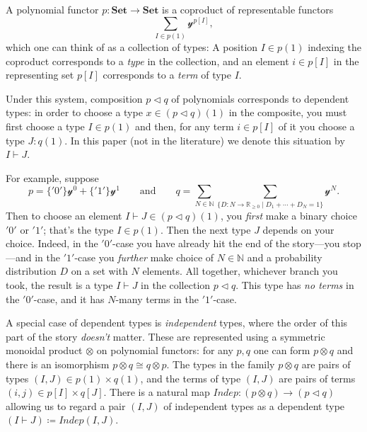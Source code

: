 \documentclass[11pt, one side, article]{memoir}
\theoremstyle{definition}
\theoremstyle{plain}
\newcommand{\Cat}[1]{\mathbf{#1}}%
\newcommand{\Fun}[1]{\mathit{#1}}%
\newcommand{\nn}{\mathbb{N}}
\newcommand{\rr}{\mathbb{R}}
\newcommand{\smset}{\Cat{Set}}
\newcommand{\yon}{\mathcal{y}}
\newcommand{\0}{\textsf{0}}
\newcommand{\1}{\tn{\textsf{1}}}
\newcommand{\tri}{\mathbin{\triangleleft}}
\newcommand{\indep}{\Fun{Indep}}
\newcommand{\qqand}{\qquad\text{and}\qquad}
\begin{document}
A polynomial functor $p\colon\smset\to\smset$ is a coproduct of representable functors
\[\sum_{I\in p(1)}\yon^{p[I]},\]
which one can think of as a collection of types: A position $I\in p(1)$ indexing the coproduct corresponds to a \emph{type} in the collection, and an element $i\in p[I]$ in the representing set $p[I]$ corresponds to a \emph{term} of type $I$. 

Under this system, composition $p\tri q$ of polynomials corresponds to dependent types: in order to choose a type $x\in (p\tri q)(1)$ in the composite, you must first choose a type $I\in p(1)$ and then, for any term $i\in p[I]$ of it you choose a type $J:q(1)$. In this paper (not in the literature) we denote this situation by $I\vdash J$. 

For example, suppose
\[
  p=\{{'0'}\}\yon^0+\{{'1'}\}\yon^1
  \qqand 
  q=\sum_{N\in\nn}\sum_{\{D\colon N\to\rr_{\geq 0}\mid D_1+\cdots+D_N=1\}}\yon^N.
\]
Then to choose an element $I\vdash J\in (p\tri q)(1)$, you \emph{first} make a binary choice ${'0'}$ or ${'1'}$; that's the type $I\in p(1)$. Then the next type $J$ depends on your choice. Indeed, in the ${'0'}$-case you have already hit the end of the story---you stop---and in the ${'1'}$-case you \emph{further} make choice of $N\in\nn$ and a probability distribution $D$ on a set with $N$ elements. All together, whichever branch you took, the result is a type $I\vdash J$ in the collection $p\tri q$. This type has \emph{no terms} in the ${'0'}$-case, and it has $N$-many terms in the ${'1'}$-case.

A special case of dependent types is \emph{independent} types, where the order of this part of the story \emph{doesn't} matter. These are represented using a symmetric monoidal product $\otimes$ on polynomial functors: for any $p,q$ one can form $p\otimes q$ and there is an isomorphism $p\otimes q\cong q\otimes p$. The types in the family $p\otimes q$ are pairs of types $(I,J)\in p(1)\times q(1)$, and the terms of type $(I,J)$ are pairs of terms $(i,j)\in p[I]\times q[J]$. There is a natural map $\indep\colon(p\otimes q)\to (p\tri q)$ allowing us to regard a pair $(I,J)$ of independent types as a dependent type $(I\vdash J)\coloneqq\indep(I,J)$.
\end{document}
